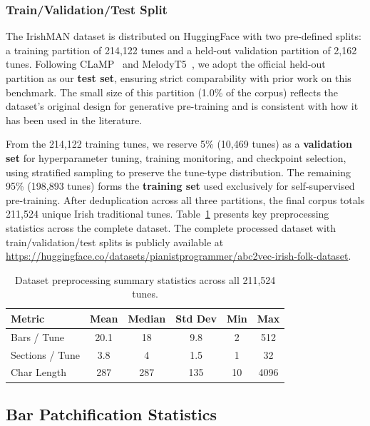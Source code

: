 \documentclass[]{interact}
\theoremstyle{plain}
\theoremstyle{definition}
\theoremstyle{remark}
\begin{document}
\subsubsection{Train/Validation/Test Split}
The IrishMAN dataset is distributed on HuggingFace with two pre-defined splits: a training partition of 214,122 tunes and a held-out validation partition of 2,162 tunes. Following CLaMP~\cite{CLaMP2023} and MelodyT5~\cite{MelodyT5_2024}, we adopt the official held-out partition as our \textbf{test set}, ensuring strict comparability with prior work on this benchmark. The small size of this partition (1.0\% of the corpus) reflects the dataset's original design for generative pre-training and is consistent with how it has been used in the literature.

From the 214,122 training tunes, we reserve 5\% (10,469 tunes) as a \textbf{validation set} for hyperparameter tuning, training monitoring, and checkpoint selection, using stratified sampling to preserve the tune-type distribution. The remaining 95\% (198,893 tunes) forms the \textbf{training set} used exclusively for self-supervised pre-training. After deduplication across all three partitions, the final corpus totals 211,524 unique Irish traditional tunes. Table~\ref{tab:preprocessing_stats} presents key preprocessing statistics across the complete dataset. The complete processed dataset with train/validation/test splits is publicly available at \url{https://huggingface.co/datasets/pianistprogrammer/abc2vec-irish-folk-dataset}.

\begin{table}[h]
\centering
\caption{Dataset preprocessing summary statistics across all 211,524 tunes.}
\label{tab:preprocessing_stats}
\begin{tabular}{lccccc}
\toprule
\textbf{Metric} & \textbf{Mean} & \textbf{Median} & \textbf{Std Dev} & \textbf{Min} & \textbf{Max} \\
\midrule
Bars / Tune      & 20.1 & 18 & 9.8  & 2   & 512 \\
Sections / Tune  & 3.8  & 4  & 1.5  & 1   & 32  \\
Char Length      & 287  & 287 & 135 & 10  & 4096 \\
\bottomrule
\end{tabular}
\end{table}

\subsection{Bar Patchification Statistics}
\end{document}
